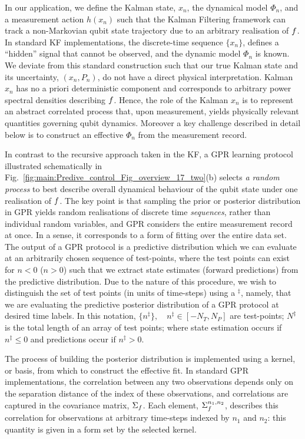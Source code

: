 In our application, we define the Kalman state, $x_n$, the dynamical model $\Phi_n$, and a measurement action $h(x_n)$ such that the Kalman Filtering framework can track a non-Markovian qubit state trajectory due to an arbitrary realisation of $f$. In standard KF implementations, the discrete-time sequence $\{x_n\}$, defines a ``hidden'' signal that cannot be observed, and the dynamic model $\Phi_n$ is known.  We deviate from this standard construction such that our true Kalman state and its uncertainty, $(x_n, P_n)$, do not have a direct physical interpretation.  Kalman $x_n$ has no a priori deterministic component and corresponds to arbitrary power spectral densities describing $f$. Hence, the role of the Kalman $x_n$ is to represent an abstract correlated process that, upon measurement, yields physically relevant quantities governing qubit dynamics.  Moreover a key challenge described in detail below is to construct an effective $\Phi_{n}$ from the measurement record.   

In contrast to the recursive approach taken in the KF, a GPR learning protocol illustrated schematically in Fig.~\ref{fig:main:Predive_control_Fig_overview_17_two}(b) selects \textit{a random process} to best describe overall dynamical behaviour of the qubit state under one realisation of $f$. The key point is that sampling the prior or posterior distribution in GPR yields random realisations of discrete time \textit{sequences}, rather than individual random variables, and GPR considers the entire measurement record at once.  In a sense, it corresponds to a form of fitting over the entire data set.  The output of a GPR protocol is a predictive distribution which we can evaluate at an arbitrarily chosen sequence of test-points, where the test points can exist  for $n<0$ ($n>0$) such that we extract state estimates (forward predictions) from the predictive distribution. Due to the nature of this procedure, we wish to distinguish the set of test points (in units of time-steps)  using a ${}^\ddagger$, namely, that we are evaluating the predictive posterior distribution of a GPR protocol at desired time labels. In this notation, $\{ n^{\ddagger} \}, \quad n^{\ddagger} \in [-N_T, N_P]$ are test-points; $N^{\ddagger}$ is the total length of an array of test points; where state estimation occurs if $n^{\ddagger} \leq 0$ and predictions occur if $n^{\ddagger}>0$. 

The process of building the posterior distribution is implemented using a kernel, or basis, from which to construct the effective fit.  In standard GPR implementations, the correlation between any two observations depends only on the separation distance of the index of these observations, and correlations are captured in the covariance matrix, $\Sigma_f$. Each element, $\Sigma_f^{n_1, n_2}$, describes this correlation for observations at arbitrary time-steps indexed by $n_1$ and $n_2$: this quantity is given in a form set by the selected kernel. 

